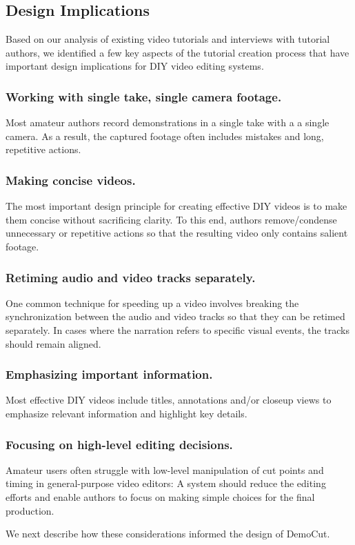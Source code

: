 
\subsection{Design Implications}

Based on our analysis of existing video tutorials and interviews with
tutorial authors, we identified a few key aspects of the tutorial creation
process that have important design implications for DIY video
editing systems.

\subsubsection{Working with single take, single camera footage.}
%
Most amateur authors record demonstrations in a single take with a
a single camera. As a result, the captured footage often includes
mistakes and long, repetitive actions.

\subsubsection{Making concise videos.}
%
The most important design principle for creating effective DIY videos
is to make them concise without sacrificing clarity. To this end,
authors remove/condense unnecessary or repetitive actions so that the
resulting video only contains salient footage.

\subsubsection{Retiming audio and video tracks separately.}
%
One common technique for speeding up a video involves breaking the
synchronization between the audio and video tracks so that they can be retimed
separately. In cases where the narration refers to
specific visual events, the tracks should remain aligned.

\subsubsection{Emphasizing important information.}
%
Most effective DIY videos include titles, annotations and/or closeup
views to emphasize relevant information and highlight key details.

\subsubsection{Focusing on high-level editing decisions.}
Amateur users often struggle with low-level manipulation of cut points and timing in general-purpose video editors: A system should reduce the editing efforts and enable authors to focus on making simple choices for the final production.

We next describe how these considerations informed the design of DemoCut.
